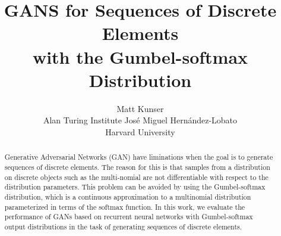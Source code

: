 \documentclass{article}
\title{GANS for Sequences of Discrete Elements \\with the Gumbel-softmax Distribution}
\author{
    Matt Kunser\\
    Alan Turing Institute
    \And
    Jos\'e Miguel Hern\'andez-Lobato\\
    Harvard University
}
\begin{document}

\maketitle

\begin{abstract}
Generative Adversarial Networks (GAN) have liminations when the goal is to
generate sequences of discrete elements. The reason for this is that
samples from a distribution on discrete objects such as the multi-nomial are
not differentiable with respect to the distribution parameters. This problem
can be avoided by using the Gumbel-softmax distribution, which is a continuous
approximation to a multinomial distribution parameterized in terms of the
softmax function. In this work, we evaluate the performance of GANs based on
recurrent neural networks with Gumbel-softmax output distributions in the task
of generating sequences of discrete elements.
\end{abstract}








\end{document}
